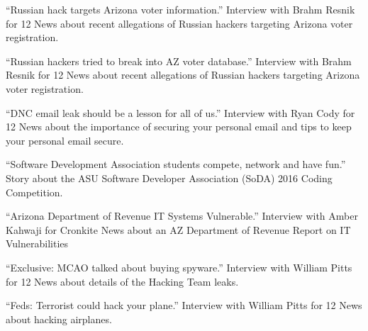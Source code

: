 \documentclass[11pt,letterpaper,sans]{moderncv}
\begin{document}
 {``Russian hack targets Arizona voter
  information.'' Interview with Brahm Resnik for 12 News about recent allegations of Russian hackers targeting Arizona voter registration.}

 {``Russian hackers tried to break into AZ
  voter database.'' Interview with Brahm Resnik for 12 News about recent allegations of Russian hackers targeting Arizona voter registration.}

 {``DNC email leak should be a lesson for all
  of us.'' Interview with Ryan Cody for 12 News about the importance of securing your personal email and tips to keep your personal email secure.}

 {``Software Development Association students
  compete, network and have fun.'' Story about the ASU Software Developer Association (SoDA) 2016 Coding Competition.}

 {``Arizona Department of Revenue IT Systems
  Vulnerable.'' Interview with Amber Kahwaji for Cronkite News about an AZ Department of Revenue Report on IT Vulnerabilities}

 {``Exclusive: MCAO talked about buying
  spyware.'' Interview with William Pitts for 12 News about details of the Hacking Team leaks.}

 {``Feds: Terrorist could hack your plane.'' Interview with William Pitts for 12 News about hacking airplanes.}
\end{document}
